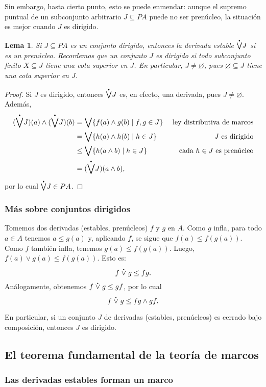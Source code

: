 \documentclass[12pt,letterpaper,titlepage]{article}
\let\emptyset\varnothing
\newtheorem{lemma}{Lema}
\theoremstyle{definition}
\renewcommand\sup{\vee}
\newcommand\Sup{\bigvee}
\renewcommand\inf{\wedge}
\newcommand\psup{%
    {\;\stackrel{\raisebox{-3pt}{\scalebox{0.4}{$\bullet$}}}{\vee}\;}
  }%
\newcommand\pSup{%
    {\stackrel{\raisebox{-3pt}{\scalebox{0.5}{$\bullet$}}}{\bigvee}}
  }%
\newcommand\<{\langle}
\renewcommand\>{\rangle}
\begin{document}
Sin embargo, hasta cierto punto, esto se puede enmendar:
aunque el supremo puntual de un subconjunto arbitrario $J\subseteq PA$
puede no ser prenúcleo, la situación es mejor cuando $J$ es dirigido.
\begin{lemma}
    Si $J\subseteq PA$ es un conjunto dirigido,
    entonces la derivada estable $\pSup J$ sí es un prenúcleo.
    Recordemos que un conjunto $J$ es dirigido si todo subconjunto
    finito $X\subseteq J$ tiene una cota superior en $J$.
    En particular, $J\neq\emptyset$, pues $\emptyset\subseteq J$ tiene
    una cota superior en $J$.
\end{lemma}
\begin{proof}
    Si $J$ es dirigido, entonces $\pSup J$ es,
    en efecto, una derivada, pues $J\neq\emptyset$.
    Además,
    \begin{align*}
      (\pSup J)(a) \inf (\pSup J)(b)
      &= \Sup\{f(a)\inf g(b) \mid f,g\in J\}
        & \text{ ley distributiva de marcos} \\
      &= \Sup\{h(a) \inf h(b)  \mid h\in J \}
        & \text{ $J$ es dirigido} \\
      &\leq \Sup\{h(a \inf b)  \mid h\in J \}
        & \text{ cada $h\in J$ es prenúcleo} \\
      &= (\pSup J)(a\inf b),
    \end{align*}
    por lo cual $\pSup J\in PA$.
\end{proof}

\subsubsection{Más sobre conjuntos dirigidos}

Tomemos dos derivadas (estables, prenúcleos) $f$ y $g$ en $A$.
Como $g$ infla, para todo $a\in A$ tenemos $a\leq g(a)$ y,
aplicando $f$, se sigue que $f(a)\leq f(g(a))$.
Como $f$ también infla, tenemos $g(a)\leq f(g(a))$.
Luego, $f(a)\sup g(a) \leq f(g(a))$.
Esto es:
\[
  f\psup g \leq fg
.\]
Análogamente, obtenemos $f\psup g\leq gf$, por lo cual
\[
  f\psup g \leq fg\inf gf
.\]

En particular, si un conjunto $J$ de derivadas (estables,
prenúcleos) es cerrado bajo composición, entonces $J$ es dirigido.

\subsection{El teorema fundamental de la teoría de marcos}
\subsubsection{Las derivadas estables forman un marco}
\end{document}
